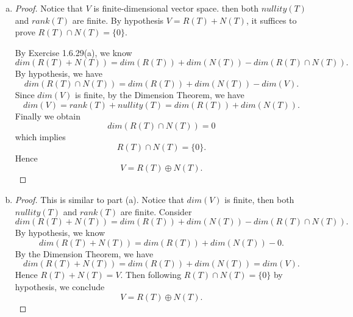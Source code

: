 \begin{Exercise}
\begin{enumerate}[(a)]
\item
\begin{proof}
Notice that $V$ is finite-dimensional vector space. then both $nullity(T)$ and $rank(T)$ are finite. By hypothesis $V=R(T)+N(T)$, it suffices to prove $R(T)\cap N(T) = \{0\}$.

By Exercise 1.6.29(a), we know 
$$
dim(R(T)+N(T)) = dim(R(T))+dim(N(T))-dim(R(T)\cap N(T)).
$$
By hypothesis, we have
$$
dim(R(T)\cap N(T)) = dim(R(T))+dim(N(T))-dim(V).
$$
Since $dim(V)$ is finite, by the Dimension Theorem, we have
$$
dim(V) = rank(T)+ nullity(T) = dim(R(T))+dim(N(T)).
$$
Finally we obtain
$$
dim(R(T)\cap N(T)) = 0
$$
which implies
$$
R(T)\cap N(T) = \{0\}.
$$
Hence
$$
V = R(T)\oplus N(T).
$$
\end{proof}

\item
\begin{proof}
This is similar to part (a). Notice that $dim(V)$ is finite, then both $nullity(T)$ and $rank(T)$ are finite. Consider
$$
dim(R(T)+N(T)) = dim(R(T))+dim(N(T))-dim(R(T)\cap N(T)).
$$
By hypothesis, we know
$$
dim(R(T)+N(T)) = dim(R(T))+dim(N(T))-0.
$$
By the Dimension Theorem, we have
$$
dim(R(T)+N(T)) = dim(R(T))+dim(N(T)) = dim(V).
$$
Hence $R(T)+N(T) = V$. Then following $R(T)\cap N(T) = \{0\}$ by hypothesis, we conclude
$$
V = R(T)\oplus N(T).
$$
\end{proof}
\end{enumerate}
\end{Exercise}